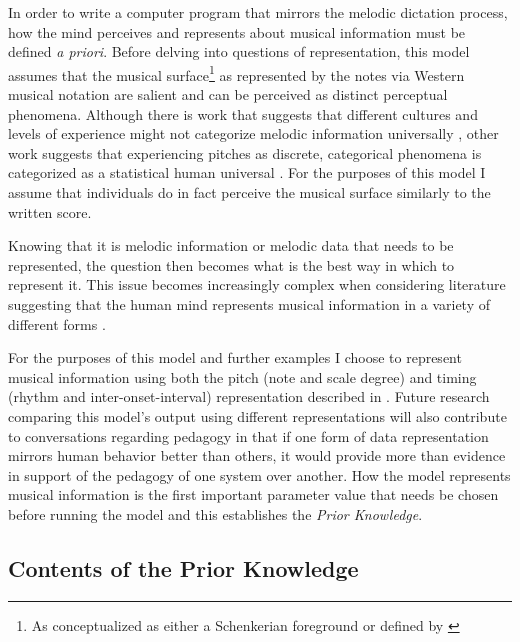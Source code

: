 \documentclass[]{book}
\let\rmarkdownfootnote\footnote%
\def\footnote{\protect\rmarkdownfootnote}
\begin{document}
In order to write a computer program that mirrors the melodic dictation process, how the mind perceives and represents about musical information must be defined \emph{a priori}.
Before delving into questions of representation, this model assumes that the musical surface\footnote{As conceptualized as either a Schenkerian foreground \citep{schenkerFreieSatz1935} or defined by \citet{lerdahlGenerativeTheoryTonal1986}} as represented by the notes via Western musical notation are salient and can be perceived as distinct perceptual phenomena.
Although there is work that suggests that different cultures and levels of experience might not categorize melodic information universally \citep{mcdermottIndifferenceDissonanceNative2016}, other work suggests that experiencing pitches as discrete, categorical phenomena is categorized as a statistical human universal \citep{savageStatisticalUniversalsReveal2015}.
For the purposes of this model I assume that individuals do in fact perceive the musical surface similarly to the written score.

Knowing that it is melodic information or melodic data that needs to be represented, the question then becomes what is the best way in which to represent it.
This issue becomes increasingly complex when considering literature suggesting that the human mind represents musical information in a variety of different forms \citep{krumhanslCognitiveFoundationsMusical2001, levitinCurrentAdvancesCognitive2009}.

For the purposes of this model and further examples I choose to represent musical information using both the pitch (note and scale degree) and timing (rhythm and inter-onset-interval) representation described in \citet{pearceStatisticalLearningProbabilistic2018a}.
Future research comparing this model's output using different representations will also contribute to conversations regarding pedagogy in that if one form of data representation mirrors human behavior better than others, it would provide more than evidence in support of the pedagogy of one system over another.
How the model represents musical information is the first important parameter value that needs be chosen before running the model and this establishes the \emph{Prior Knowledge}.

\hypertarget{contents-of-the-prior-knowledge}{%
\subsection{Contents of the Prior Knowledge}\label{contents-of-the-prior-knowledge}}
\end{document}
